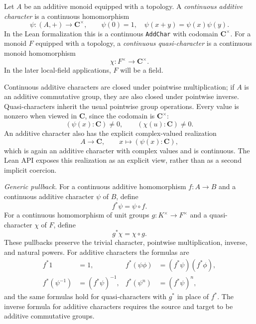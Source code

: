 \begin{definition}\label{mod:basic-charactertypes}
Let \(A\) be an additive monoid equipped with a topology.  A
\emph{continuous additive character} is a continuous homomorphism
\[
 \psi:(A,+)\longrightarrow\mathbf C^\times,
 \qquad
 \psi(0)=1,
 \quad
 \psi(x+y)=\psi(x)\psi(y).
\]
In the Lean formalization this is a continuous \texttt{AddChar} with
codomain \(\mathbf C^\times\).  For a monoid \(F\) equipped with a
topology, a \emph{continuous quasi-character} is a continuous monoid
homomorphism
\[
 \chi:F^\times\longrightarrow\mathbf C^\times.
\]
In the later local-field applications, \(F\) will be a field.

Continuous additive characters are closed under pointwise multiplication;
if \(A\) is an additive commutative group, they are also closed under
pointwise inverse.  Quasi-characters inherit the usual pointwise group
operations.  Every value is nonzero when viewed in \(\mathbf C\), since
the codomain is \(\mathbf C^\times\):
\[
 (\psi(x):\mathbf C)\ne0,
 \qquad
 (\chi(u):\mathbf C)\ne0.
\]
An additive character also has the explicit complex-valued realization
\[
 A\longrightarrow\mathbf C,
 \qquad
 x\longmapsto(\psi(x):\mathbf C),
\]
which is again an additive character with complex values and is continuous.
The Lean API exposes this realization as an explicit view, rather than as
a second implicit coercion.

\smallskip\noindent\emph{Generic pullback.}
For a continuous additive homomorphism \(f:A\to B\) and a continuous
additive character \(\psi\) of \(B\), define
\[
 f^*\psi=\psi\circ f.
\]
For a continuous homomorphism of unit groups
\(g:K^\times\to F^\times\) and a quasi-character \(\chi\) of \(F\),
define
\[
 g^*\chi=\chi\circ g.
\]
These pullbacks preserve the trivial character, pointwise multiplication,
inverse, and natural powers.  For additive characters the formulas are
\[
 \begin{aligned}
  f^*1&=1,&
  f^*(\psi\phi)&=(f^*\psi)(f^*\phi),\\
  f^*(\psi^{-1})&=(f^*\psi)^{-1},&
  f^*(\psi^n)&=(f^*\psi)^n,
 \end{aligned}
\]
and the same formulas hold for quasi-characters with \(g^*\) in place of
\(f^*\).  The inverse formula for additive characters requires the source
and target to be additive commutative groups.


\end{definition}
